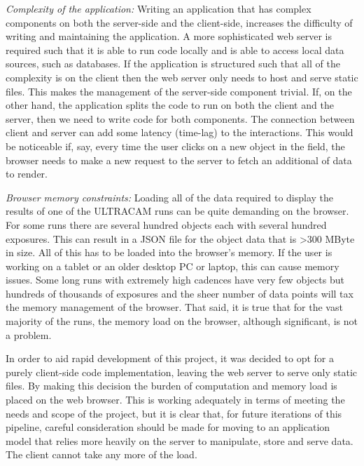 \emph{Complexity of the application:} Writing an application that has complex components on both the server-side and the client-side, increases the difficulty of writing and maintaining the application. A more sophisticated web server is required such that it is able to run code locally and is able to access local data sources, such as databases. If the application is structured such that all of the complexity is on the client then the web server only needs to host and serve static files. This makes the management of the server-side component trivial. If, on the other hand, the application splits the code to run on both the client and the server, then we need to write code for both components. The connection between client and server can add some latency (time-lag) to the interactions. This would be noticeable if, say, every time the user clicks on a new object in the field, the browser needs to make a new request to the server to fetch an additional of data to render.  

\emph{Browser memory constraints:} Loading all of the data required to display the results of one of the ULTRACAM runs can be quite demanding on the browser. For some runs there are several hundred objects each with several hundred exposures. This can result in a JSON file for the object data that is \textgreater 300 MByte in size. All of this has to be loaded into the browser's memory. If the user is working on a tablet or an older desktop PC or laptop, this can cause memory issues. Some long runs with extremely high cadences have very few objects but hundreds of thousands of exposures and the sheer number of data points will tax the memory management of the browser. That said, it is true that for the vast majority of the runs, the memory load on the browser, although significant, is not a problem. 

In order to aid rapid development of this project, it was decided to opt for a purely client-side code implementation, leaving the web server to serve only static files. By making this decision the burden of computation and memory load is placed on the web browser. This is working adequately in terms of meeting the needs and scope of the project, but it is clear that, for future iterations of this pipeline, careful consideration should be made for moving to an application model that relies more heavily on the server to manipulate, store and serve data. The client cannot take any more of the load. 

